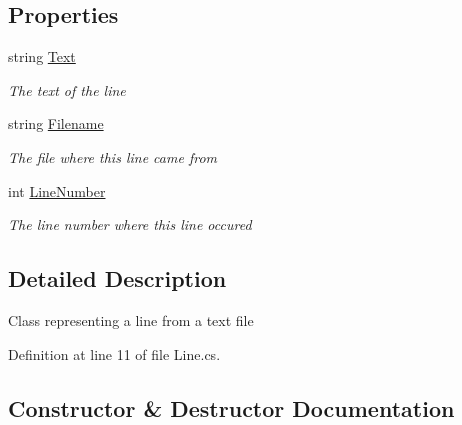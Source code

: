 \subsection*{Properties}
\begin{DoxyCompactItemize}
\item 
string \hyperlink{classHumDrum_1_1Operations_1_1Files_1_1Line_a885daada20e09b8b049b1804b0b44005}{Text}
\begin{DoxyCompactList}\small\item\em The text of the line \end{DoxyCompactList}\item 
string \hyperlink{classHumDrum_1_1Operations_1_1Files_1_1Line_ac9436ae7b88a971f32d4011a7e523d26}{Filename}
\begin{DoxyCompactList}\small\item\em The file where this line came from \end{DoxyCompactList}\item 
int \hyperlink{classHumDrum_1_1Operations_1_1Files_1_1Line_acb6f59b3bf5a85ebfb190f53d0cb7c3b}{Line\+Number}
\begin{DoxyCompactList}\small\item\em The line number where this line occured \end{DoxyCompactList}\end{DoxyCompactItemize}


\subsection{Detailed Description}
Class representing a line from a text file 



Definition at line 11 of file Line.\+cs.



\subsection{Constructor \& Destructor Documentation}
